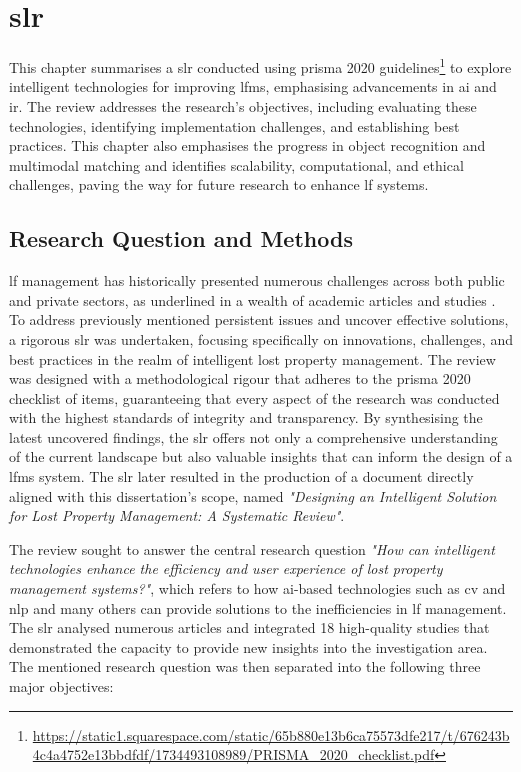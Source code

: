 
\section{\acl{slr}} \label{chapter:literature-review}

This chapter summarises a \ac{slr} conducted using \ac{prisma} 2020 \cite{Page2021} guidelines\footnote{\url{https://static1.squarespace.com/static/65b880e13b6ca75573dfe217/t/676243b4c4a4752e13bbdfdf/1734493108989/PRISMA_2020_checklist.pdf}} to explore intelligent technologies for improving \ac{lfms}, emphasising advancements in \ac{ai} and \ac{ir}. The review addresses the research's objectives, including evaluating these technologies, identifying implementation challenges, and establishing best practices. This chapter also emphasises the progress in object recognition and multimodal matching and identifies scalability, computational, and ethical challenges, paving the way for future research to enhance \ac{lf} systems.

\subsection{Research Question and Methods} \label{subsec:slr}

\ac{lf} management has historically presented numerous challenges across both public and private sectors, as underlined in a wealth of academic articles and studies \cite{Prawira2024}. To address previously mentioned persistent issues and uncover effective solutions, a rigorous \ac{slr} was undertaken, focusing specifically on innovations, challenges, and best practices in the realm of intelligent lost property management. The review was designed with a methodological rigour that adheres to the \ac{prisma} 2020 checklist of items, guaranteeing that every aspect of the research was conducted with the highest standards of integrity and transparency. By synthesising the latest uncovered findings, the \ac{slr} offers not only a comprehensive understanding of the current landscape but also valuable insights that can inform the design of a \ac{lfms} system. The \ac{slr} later resulted in the production of a document directly aligned with this dissertation's scope, named \textit{"Designing an Intelligent Solution for Lost Property Management: A Systematic Review"}.

The review sought to answer the central research question \textit{"How can intelligent technologies enhance the efficiency and user experience of lost property management systems?"}, which refers to how \ac{ai}-based technologies such as \ac{cv} and \ac{nlp} and many others can provide solutions to the inefficiencies in \ac{lf} management. The \ac{slr} analysed numerous articles and integrated 18 high-quality studies that demonstrated the capacity to provide new insights into the investigation area. The mentioned research question was then separated into the following three major objectives:

